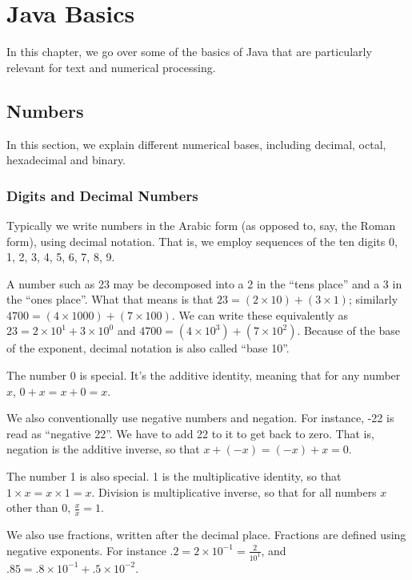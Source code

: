 \chapter{Java Basics}\label{chapter:java}

In this chapter, we go over some of the basics of Java that are
particularly relevant for text and numerical processing.  

\section{Numbers}\label{section:java-numbers}

In this section, we explain different numerical bases, including
decimal, octal, hexadecimal and binary.  

\subsection{Digits and Decimal Numbers}

Typically we write numbers in the Arabic form (as opposed to, say, the
Roman form), using decimal notation.  That is, we employ sequences of the
ten digits 0, 1, 2, 3, 4, 5, 6, 7, 8, 9.  

A number such as 23 may be decomposed into a 2 in the ``tens place''
and a 3 in the ``ones place''.  What that means is that $23 = (2 \times
10) + (3 \times 1)$; similarly $4700 = (4 \times 1000) + (7 \times
100)$.  We can write these equivalently as $23 = 2 \times 10^1 + 3 \times 10^0$
and $4700 = (4 \times 10^3) + (7 \times 10^2)$.  Because of the base
of the exponent, decimal notation is also called ``base 10''.

The number 0 is special.  It's the additive identity, meaning
that for any number $x$, $0 + x = x + 0 = x$.  

We also conventionally use negative numbers and negation.  For
instance, -22 is read as ``negative 22''.  We have to add 22 to it to
get back to zero.  That is, negation is the additive inverse, so that
$x + (-x) = (-x) + x = 0$.

The number 1 is also special.  1 is the multiplicative identity,
so that $1 \times x = x \times 1 = x$.  Division is multiplicative
inverse, so that for all numbers $x$ other than 0, $\frac{x}{x} = 1$.

We also use fractions, written after the decimal place.  Fractions are
defined using negative exponents.  For instance $.2 = 2 \times 10^{-1}
= \frac{2}{10^1}$, and $.85 = .8 \times 10^{-1} + .5 \times 10^{-2}$.

